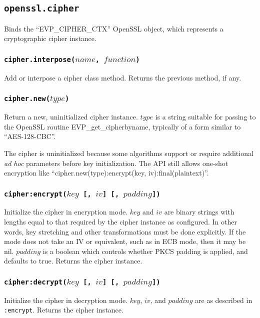 \documentclass[11pt, oneside]{memoir}
\newcommand*{\fn}[1]{\texttt{#1}\xspace}
\newcounter{toccols}
\newenvironment{Module}[1]{
	\subsection{\texttt{#1}}
	\addtocontents{toc}{
		\protect\begin{multicols}{\value{toccols}}
	}
}{
	\addtocontents{toc}{\protect\end{multicols}}
}
\begin{document}
\begin{Module}{openssl.cipher}

Binds the ``EVP\_CIPHER\_CTX'' OpenSSL object, which represents a cryptographic cipher instance.

\subsubsection[\fn{cipher.interpose}]{\fn{cipher.interpose($name$, $function$)}}

Add or interpose a cipher class method. Returns the previous method, if any.

\subsubsection[\fn{cipher.new}]{\fn{cipher.new($type$)}}

Return a new, uninitialized cipher instance. $type$ is a string suitable for passing to the OpenSSL routine EVP\_get\_cipherbyname, typically of a form similar to ``AES-128-CBC''.

The cipher is uninitialized because some algorithms support or require additional \textit{ad hoc} parameters before key initialization. The API still allows one-shot encryption like ``cipher.new(type):encrypt(key, iv):final(plaintext)''.

\subsubsection[\fn{cipher:encrypt}]{\fn{cipher:encrypt($key$ [, $iv$] [, $padding$])}}

Initialize the cipher in encryption mode. $key$ and $iv$ are binary strings with lengths equal to that required by the cipher instance as configured. In other words, key stretching and other transformations must be done explicitly. If the mode does not take an IV or equivalent, such as in ECB mode, then it may be nil. $padding$ is a boolean which controls whether PKCS padding is applied, and defaults to true. Returns the cipher instance.

\subsubsection[\fn{cipher:decrypt}]{\fn{cipher:decrypt($key$ [, $iv$] [, $padding$])}}

Initialize the cipher in decryption mode. $key$, $iv$, and $padding$ are as described in \fn{:encrypt}. Returns the cipher instance.


\end{Module}
\end{document}
